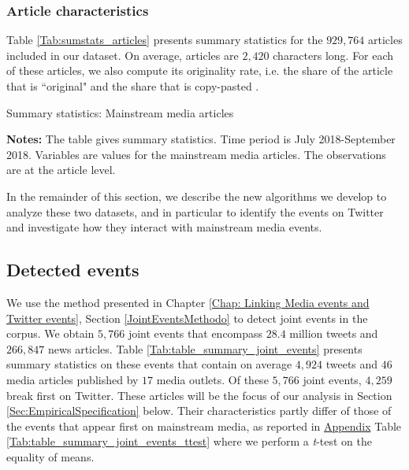 \subsubsection{Article characteristics}

Table \ref{Tab:sumstats_articles} presents summary statistics for the $929,764$ articles included in our dataset. On average, articles are $2,420$ characters long. For each of these articles, we also compute its originality rate, i.e. the share of the article that is ``original" and the share that is copy-pasted \citep{CageHerveViaud2020}.


\begin{table}
\caption{Summary statistics: Mainstream media articles}
\begin{center}
	
\end{center}
\begin{spacing}{0.5}
	{\fns \textbf{Notes:} The table gives summary statistics. Time period is July 2018-September 2018. Variables are values for the mainstream media articles. The observations are at the article level.} 
\end{spacing}
\label{Tab:sumstats_articles}
\end{table} 



\medskip
In the remainder of this section, we describe the new algorithms we develop to analyze these two datasets, and in particular to identify the events on Twitter and investigate how they interact with mainstream media events.



\subsection{Detected events}

We use the method presented in Chapter \ref{Chap: Linking Media events and Twitter events}, Section \ref{JointEventsMethodo} to detect joint events in the corpus. We obtain $5,766$ joint events that encompass $28.4$ million tweets and $266,847$ news articles. Table \ref{Tab:table_summary_joint_events} presents summary statistics on these events that contain on average $4,924$ tweets and $46$ media articles published by $17$ media outlets. Of these $5,766$ joint events, $4,259$ break first on Twitter. These articles will be the focus of our analysis in Section \ref{Sec:EmpiricalSpecification} below. Their characteristics partly differ of those of the events that appear first on mainstream media, as reported in \hyperlink{ref:Appendix}{Appendix} Table \ref{Tab:table_summary_joint_events_ttest} where we perform a \textit{t}-test on the equality of means.


